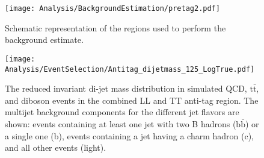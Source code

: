 

\begin{figure}[h!]
  \centering
    \texttt{[image: Analysis/BackgroundEstimation/pretag2.pdf]}
  \caption{Schematic representation of the regions used to perform the background estimate.} \label{fig:ABCDEFregions}
\end{figure}

\begin{figure}[h!]
\begin{center}
\texttt{[image: Analysis/EventSelection/Antitag\_dijetmass\_125\_LogTrue.pdf]}
\end{center}
\caption{The reduced invariant di-jet mass distribution in simulated QCD, $\mathrm{t\bar{t}}$, and diboson events in the combined LL and TT anti-tag region. The multijet background components for the different jet flavors are shown: events containing at least one jet with two B hadrons ($\mathrm{b\bar{b}}$) or a single one (b), events containing a jet having a charm hadron (c), and all other events (light).}
\label{fig:MCcomposition_Antitag}
\end{figure}

